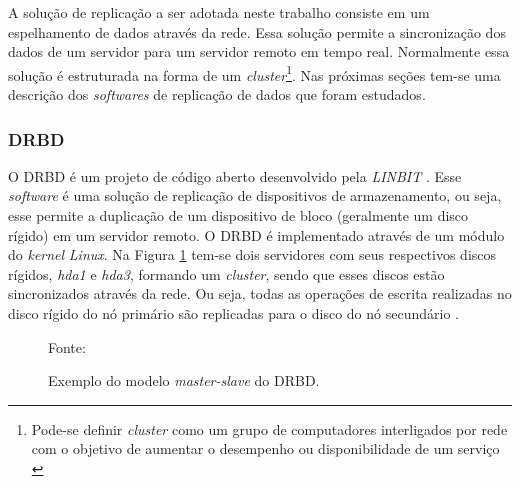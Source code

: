A solução de replicação a ser adotada neste trabalho consiste em um espelhamento de dados através da rede. Essa solução permite a sincronização 
dos dados de um servidor para um servidor remoto em tempo real. Normalmente essa solução é estruturada na forma de um 
\textit{cluster}\footnote[2]{Pode-se definir \textit{cluster} como um grupo de computadores interligados por rede com o objetivo de aumentar o 
desempenho ou disponibilidade de um serviço \cite{freitas2005}}.
Nas próximas seções tem-se uma descrição dos \textit{softwares} de replicação de dados que foram estudados.


\subsubsection{DRBD}
\label{section:drbd}
O \ac{DRBD} é um projeto de código aberto desenvolvido pela \textit{LINBIT} \cite{drbd}.
Esse \textit{software} é uma solução de replicação de dispositivos de armazenamento, ou seja, esse permite a duplicação de um dispositivo de bloco 
(geralmente um disco rígido) em um servidor remoto. O \ac{DRBD} é implementado através de um módulo do \textit{kernel} \textit{Linux}. 
Na Figura \ref{fig:drbd_basic} tem-se dois servidores com seus respectivos discos rígidos, \textit{hda1} e 
\textit{hda3}, formando um \textit{cluster}, sendo que esses discos estão sincronizados através da rede. Ou seja, todas as operações de escrita 
realizadas no disco rígido do nó primário são replicadas para o disco do nó secundário \cite{zaminhani2008}.

\begin{figure}[h!]
 \centering
 \caption{Exemplo do modelo \textit{master-slave} do \ac{DRBD}.}
 Fonte: \citet{jones2010}
 \label{fig:drbd_basic}
\end{figure}

